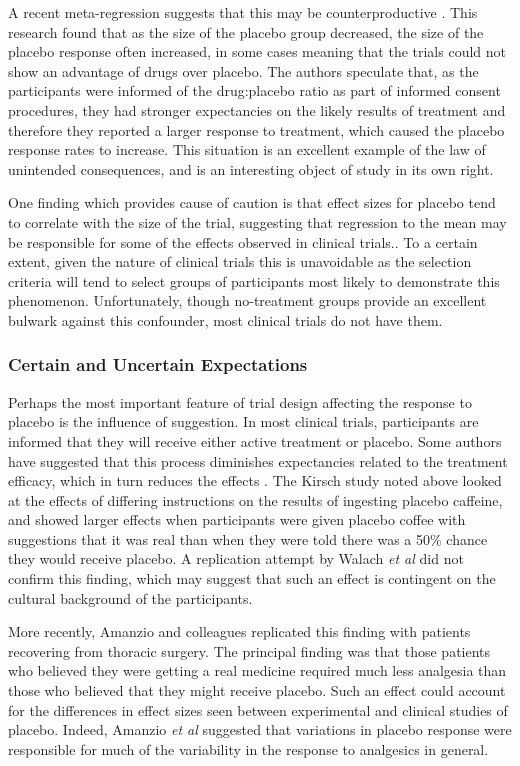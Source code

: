 A recent meta-regression suggests that this may be counterproductive \cite{Papakostas2009}.  This research found that as the size of the placebo group decreased, the size of the placebo response often increased, in some cases meaning that the trials could not show an advantage of drugs over placebo. The authors speculate that, as the participants were informed of the drug:placebo ratio as part of informed consent procedures, they had stronger expectancies on the likely results of treatment and therefore they reported a larger response to treatment, which caused the placebo response rates to increase. This situation is an excellent example of the law of unintended consequences, and is an interesting object of study in its own right. 

One finding which provides cause of caution is that effect sizes for placebo tend to correlate with the size of the trial, suggesting that regression to the mean may be responsible for some of the effects observed in clinical trials.\cite{Enck2005a}. To a certain extent, given the nature of clinical trials this is unavoidable as the selection criteria will tend to select groups of participants most likely to demonstrate this phenomenon. Unfortunately, though no-treatment groups provide an excellent bulwark against this confounder, most clinical trials do not have them. 


\subsubsection{Certain and Uncertain Expectations}

Perhaps the most important feature of trial design affecting the response to placebo  is the influence of suggestion. In most clinical trials, participants are informed that they will receive either active treatment or placebo. Some authors have suggested \cite{kirsch1988double} that this process diminishes expectancies related to the treatment efficacy, which in turn reduces the effects \cite{Kleijnen1994}. The Kirsch study noted above looked at the effects of differing instructions on the results of ingesting placebo caffeine, and showed larger effects when participants were given placebo coffee with suggestions that it was real than when they were told there was a 50\% chance they would receive placebo. A replication attempt by Walach \textit{et al} did not confirm this finding, which may suggest that such an effect is contingent on the cultural background of the participants. 

More recently,  Amanzio and colleagues \cite{Amanzio2001} replicated this finding with patients recovering from thoracic surgery. The principal finding was that those patients who believed they were getting a real medicine required much less analgesia than those who believed that they might receive placebo. Such an effect could account for the differences in effect sizes seen between experimental and clinical studies of placebo. Indeed, Amanzio \textit{et al } suggested that variations in placebo response were responsible for much of the variability in the response to analgesics in general.

